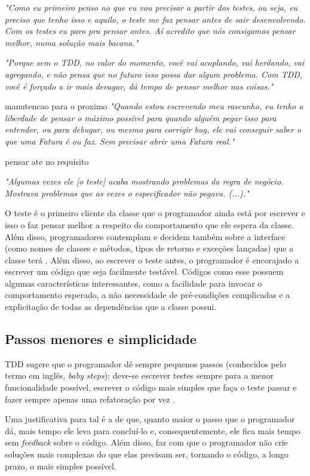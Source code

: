 \textit{"Como eu primeiro penso no que eu vou precisar a partir dos testes, ou seja, eu preciso que tenho
isso e aquilo, o teste me faz pensar antes de sair desenvolvendo. Com os testes eu paro pra pensar antes.
Aí acredito que nós consigamos pensar melhor, numa solução mais bacana."}

\textit{"Porque sem o TDD, no calor do momento, você vai acoplando, vai herdando, vai agregando, e não pensa
que no futuro isso possa dar algum problema. Com TDD, você é forçado a ir mais devagar, dá tempo de pensar melhor nas
coisas."}

manutencao para o proximo
\textit{"Quando estou escrevendo meu rascunho, eu tenho a liberdade de pensar o máximo possível para quando alguém
pegar isso para entender, ou para debugar, ou mesmo para corrigir bug, ele vai conseguir saber o que uma Fatura é ou faz. Sem
precisar abrir uma Fatura real."}

pensar ate no requisito

\textit{"Algumas vezes ele [o teste] acaba mostrando problemas da regra de negócio. Mostrava problemas
que as vezes o especificador não pegava. (...)."}

O teste é o primeiro cliente da
classe que o programador ainda está por escrever e isso o faz pensar
melhor a respeito do comportamento que ele espera da classe. Além disso,
programadores contemplam e decidem também sobre a interface (como nomes de
classes e métodos, tipos de retorno e exceções lançadas) que a classe terá
\cite{janzen-saiedian}.
Além disso, ao escrever o teste antes, o programador é encorajado a escrever um
código que seja facilmente testável. Códigos como esse possuem algumas
características interessantes, como a facilidade para invocar o comportamento
esperado, a não necessidade de pré-condições complicadas e a explicitação de
todas as dependências que a classe possui.

\subsection{Passos menores e simplicidade}


TDD sugere que o programador dê sempre pequenos passos (conhecidos pelo termo em
inglês, \textit{baby steps}): deve-se escrever testes sempre para a menor
funcionalidade possível, escrever o código mais simples que faça o teste passar
e fazer sempre apenas uma refatoração por vez \cite{TDDByExample}.

Uma justificativa para tal é a de que, quanto maior o passo que o programador dá, mais
tempo ele leva para concluí-lo e, consequentemente, ele fica mais tempo
sem \textit{feedback} sobre o código. Além disso, faz com que o programador não crie
soluções mais complexas do que elas precisam ser, tornando o código, a longo
prazo, o mais simples possível.

